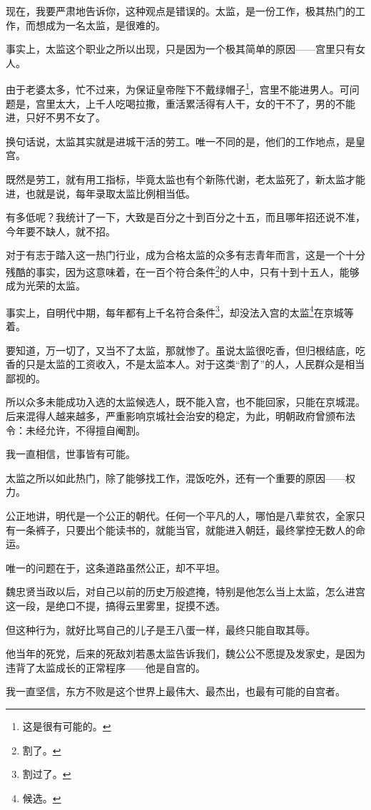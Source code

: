 \begin{multicols}{\theparacolNo}
现在，我要严肃地告诉你，这种观点是错误的。太监，是一份工作，极其热门的工作，而想成为一名太监，是很难的。

事实上，太监这个职业之所以出现，只是因为一个极其简单的原因——宫里只有女人。

由于老婆太多，忙不过来，为保证皇帝陛下不戴绿帽子\footnote{这是很有可能的。}，宫里不能进男人。可问题是，宫里太大，上千人吃喝拉撒，重活累活得有人干，女的干不了，男的不能进，只好不男不女了。

换句话说，太监其实就是进城干活的劳工。唯一不同的是，他们的工作地点，是皇宫。

既然是劳工，就有用工指标，毕竟太监也有个新陈代谢，老太监死了，新太监才能进，也就是说，每年录取太监比例相当低。

有多低呢？我统计了一下，大致是百分之十到百分之十五，而且哪年招还说不准，今年要不缺人，就不招。

对于有志于踏入这一热门行业，成为合格太监的众多有志青年而言，这是一个十分残酷的事实，因为这意味着，在一百个符合条件\footnote{割了。}的人中，只有十到十五人，能够成为光荣的太监。

事实上，自明代中期，每年都有上千名符合条件\footnote{割过了。}，却没法入宫的太监\footnote{候选。}在京城等着。

要知道，万一切了，又当不了太监，那就惨了。虽说太监很吃香，但归根结底，吃香的只是太监的工资收入，不是太监本人。对于这类“割了”的人，人民群众是相当鄙视的。

所以众多未能成功入选的太监候选人，既不能入宫，也不能回家，只能在京城混。后来混得人越来越多，严重影响京城社会治安的稳定，为此，明朝政府曾颁布法令：未经允许，不得擅自阉割。

我一直相信，世事皆有可能。

太监之所以如此热门，除了能够找工作，混饭吃外，还有一个重要的原因——权力。

公正地讲，明代是一个公正的朝代。任何一个平凡的人，哪怕是八辈贫农，全家只有一条裤子，只要出个能读书的，就能当官，就能进入朝廷，最终掌控无数人的命运。

唯一的问题在于，这条道路虽然公正，却不平坦。

魏忠贤当政以后，对自己以前的历史万般遮掩，特别是他怎么当上太监，怎么进宫这一段，是绝口不提，搞得云里雾里，捉摸不透。

但这种行为，就好比骂自己的儿子是王八蛋一样，最终只能自取其辱。

他当年的死党，后来的死敌刘若愚太监告诉我们，魏公公不愿提及发家史，是因为违背了太监成长的正常程序——他是自宫的。

我一直坚信，东方不败是这个世界上最伟大、最杰出，也最有可能的自宫者。


\end{multicols}
